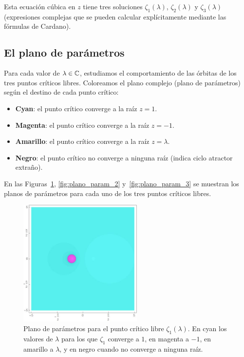 Esta ecuación cúbica en $z$ tiene tres soluciones $\zeta_1(\lambda)$, $\zeta_2(\lambda)$ y $\zeta_3(\lambda)$ (expresiones complejas que se pueden calcular explícitamente mediante las fórmulas de Cardano).

\subsection{El plano de parámetros}

Para cada valor de $\lambda\in\mathbb{C}$, estudiamos el comportamiento de las órbitas de los tres puntos críticos libres. Coloreamos el plano complejo (plano de parámetros) según el destino de cada punto crítico:
\begin{itemize}
\item \textbf{Cyan}: el punto crítico converge a la raíz $z=1$.
\item \textbf{Magenta}: el punto crítico converge a la raíz $z=-1$.
\item \textbf{Amarillo}: el punto crítico converge a la raíz $z=\lambda$.
\item \textbf{Negro}: el punto crítico no converge a ninguna raíz (indica ciclo atractor extraño).
\end{itemize}

En las Figuras~\ref{fig:plano_param_1}, \ref{fig:plano_param_2} y~\ref{fig:plano_param_3} se muestran los planos de parámetros para cada uno de los tres puntos críticos libres.

\begin{figure}[H]
\centering 
\includegraphics[width=0.55\textwidth]{fuentes/articulo-cuadraticos/imagenes/sch_m_5n_1.jpg}
\caption{Plano de parámetros para el punto crítico libre $\zeta_1(\lambda)$. En cyan los valores de $\lambda$ para los que $\zeta_1$ converge a $1$, en magenta a $-1$, en amarillo a $\lambda$, y en negro cuando no converge a ninguna raíz.}
\label{fig:plano_param_1}
\end{figure}

